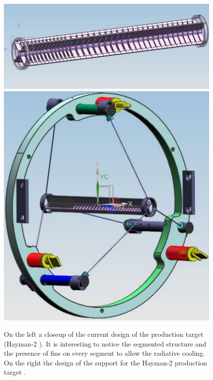 \documentclass[12pt,a4paper,openright, oneside, titlepage]{book} %
\begin{document}
\begin{figure}[h!]
\centering
\includegraphics[scale=0.45]{Hayman2}\hfill
\includegraphics[scale=0.35]{Hayman2_structure}
\caption[Hayman2 stopping target]{On the left a closeup of the current design of the production target (Hayman-2 \cite{Pushka_Hayman2} \cite{bob_Hayman2}). 
It is interesting to notice the segmented structure and the presence of fins on every segment to allow the radiative cooling. 
On the right the design of the support for the Hayman-2 production target \cite{Pushka_Hayman2}.}
\label{_Hayman2}
\end{figure}
\end{document}
